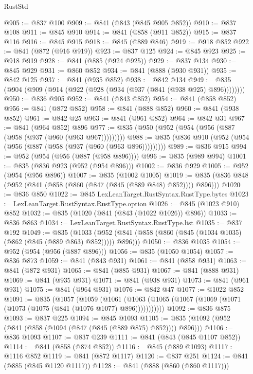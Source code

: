 \begin{lexlean}{RustStd}
\begin{coremodule}
@905 := @837 @100
@909 := @841 (@843 (@845 @905 @852))
@910 := @837 @108
@911 := @845 @910
@914 := @841 (@858 (@911 @852))
@915 := @837 @116
@916 := @845 @915
@918 := @845 (@889 @846)
@919 := @918 @852
@922 := @841 (@872 (@916 @919))
@923 := @837 @125
@924 := @845 @923
@925 := @918 @919
@928 := @841 (@885 (@924 @925))
@929 := @837 @134
@930 := @845 @929
@931 := @860 @852
@934 := @841 (@888 (@930 @931))
@935 := @842 @125
@937 := @841 (@935 @852)
@938 := @842 @134
@949 := @835 (@904 (@909 (@914 (@922 (@928 (@934 (@937 (@841 (@938 @925) @896))))))))
@950 := @836 @905
@952 := @841 (@843 @852)
@954 := @841 (@858 @852)
@956 := @841 (@872 @852)
@958 := @841 (@888 @852)
@960 := @841 (@938 @852)
@961 := @842 @25
@963 := @841 (@961 @852)
@964 := @842 @31
@967 := @841 (@964 @852) @896
@977 := @835 (@950 (@952 (@954 (@956 (@887 (@958 (@937 (@960 (@963 @967)))))))))
@988 := @835 (@836 @910 (@952 (@954 (@956 (@887 (@958 (@937 (@960 (@963 @896)))))))))
@989 := @836 @915
@994 := @952 (@954 (@956 (@887 (@958 @896))))
@996 := @835 (@989 @994)
@1001 := @835 (@836 @923 (@952 (@954 @896)))
@1002 := @836 @929
@1005 := @952 (@954 (@956 @896))
@1007 := @835 (@1002 @1005)
@1019 := @835 (@836 @848 (@952 (@841 (@858 (@860 (@847 (@845 (@889 @848) @852)))) @896)))
@1020 := @836 @850
@1022 := @845 LexLeanTarget.RustSyntax.RustType.bytes
@1023 := LexLeanTarget.RustSyntax.RustType.option
@1026 := @845 (@1023 @910) @852
@1032 := @835 (@1020 (@841 (@843 (@1022 @1026)) @896))
@1033 := @836 @863
@1034 := LexLeanTarget.RustSyntax.RustType.list
@1035 := @837 @192
@1049 := @835
    (@1033 (@952 (@841 (@858 (@860 (@845 (@1034 @1035) (@862 (@845 (@889 @863) @852))))) @896)))
@1050 := @836 @1035
@1054 := @952 (@954 (@956 (@887 @896)))
@1056 := @835 (@1050 @1054)
@1057 := @836 @873
@1059 := @841 (@843 @931)
@1061 := @841 (@858 @931)
@1063 := @841 (@872 @931)
@1065 := @841 (@885 @931)
@1067 := @841 (@888 @931)
@1069 := @841 (@935 @931)
@1071 := @841 (@938 @931)
@1073 := @841 (@961 @931)
@1075 := @841 (@964 @931)
@1076 := @842 @47
@1077 := @1022 @852
@1091 := @835
    (@1057
      (@1059
        (@1061 (@1063 (@1065 (@1067 (@1069 (@1071 (@1073 (@1075 (@841 (@1076 @1077) @896)))))))))))
@1092 := @836 @875
@1093 := @837 @225
@1094 := @845 @1093
@1105 := @835 (@1092 (@952 (@841 (@858 (@1094 (@847 (@845 (@889 @875) @852)))) @896)))
@1106 := @836 @1093
@1107 := @837 @239
@1111 := @841 (@843 (@845 @1107 @852))
@1114 := @841 (@858 (@874 @852))
@1116 := @845 (@889 @1093)
@1117 := @1116 @852
@1119 := @841 (@872 @1117)
@1120 := @837 @251
@1124 := @841 (@885 (@845 @1120 @1117))
@1128 := @841 (@888 (@860 (@860 @1117)))

\end{coremodule}
\end{lexlean}

